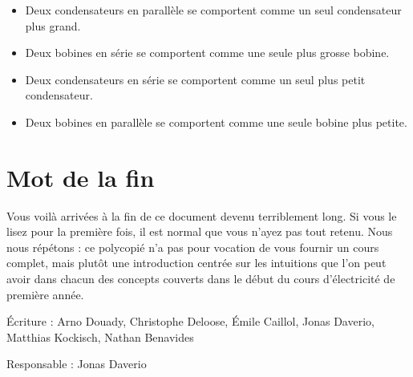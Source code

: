 \documentclass{article}
\newcommand{\inc}{\fontfamily{cmr}\selectfont\textperiodcentered}
\begin{document}
\begin{tcolorbox}[title=Parallèle et série]
\begin{itemize}
    \item Deux condensateurs en parallèle se comportent comme un seul condensateur plus grand.
    \item Deux bobines en série se comportent comme une seule plus grosse bobine.
    \item Deux condensateurs en série se comportent comme un seul plus petit condensateur.
    \item Deux bobines en parallèle se comportent comme une seule bobine plus petite.
\end{itemize}
\end{tcolorbox}
\section{Mot de la fin}

Vous voilà arrivé\inc{}e\inc{}s à la fin de ce document devenu terriblement long. Si vous le lisez pour la première fois, il est normal que vous n'ayez pas tout retenu. Nous nous répétons : ce polycopié n'a pas pour vocation de vous fournir un cours complet, mais plutôt une introduction centrée sur les intuitions que l'on peut avoir dans chacun des concepts couverts dans le début du cours d'électricité de première année.

Écriture : Arno Douady, Christophe Deloose, Émile Caillol, Jonas Daverio, Matthias Kockisch, Nathan Benavides

Responsable : Jonas Daverio
\end{document}
